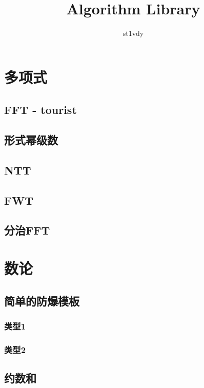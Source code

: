 \documentclass{article}
\title{Algorithm Library}
\author{st1vdy}
\begin{document}
\begin{titlepage}
\maketitle
\thispagestyle{empty}
\pagebreak
\pagestyle{plain}
\tableofcontents
\end{titlepage}
\newpage %
\section{多项式} %
\subsection{FFT - tourist}

\subsection{形式幂级数}

\subsection{NTT}

\subsection{FWT}

\subsection{分治FFT}


\section{数论}
\subsection{简单的防爆模板}
\subsubsection{类型1}

\subsubsection{类型2}

\subsection{约数和}

\end{document}
